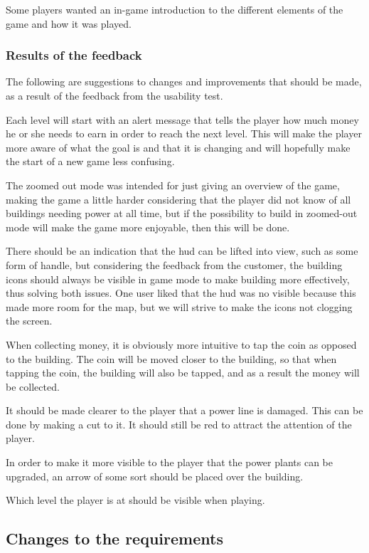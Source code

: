 			Some players wanted an in-game introduction to the different elements of the game and how it was played.

	\subsubsection*{Results of the feedback}

	The following are suggestions to changes and improvements that should be made, as a result of the feedback from the usability test.

	Each level will start with an alert message that tells the player how much money he or she needs to earn in order to reach the next level. This will make the player more aware of what the goal is and that it is changing and will hopefully make the start of a new game less confusing.

	The zoomed out mode was intended for just giving an overview of the game, making the game a little harder considering that the player did not know of all buildings needing power at all time, but if the possibility to build in zoomed-out mode will make the game more enjoyable, then this will be done.

	There should be an indication that the hud can be lifted into view, such as some form of handle, but considering the feedback from the customer, the building icons should always be visible in game mode to make building more effectively, thus solving both issues. One user liked that the hud was no visible because this made more room for the map, but we will strive to make the icons not clogging the screen.

	When collecting money, it is obviously more intuitive to tap the coin as opposed to the building. The coin will be moved closer to the building, so that when tapping the coin, the building will also be tapped, and as a result the money will be collected.

	It should be made clearer to the player that a power line is damaged. This can be done by making a cut to it. It should still be red to attract the attention of the player.

	In order to make it more visible to the player that the power plants can be upgraded, an arrow of some sort should be placed over the building.

	Which level the player is at should be visible when playing.

\subsection{Changes to the requirements}

